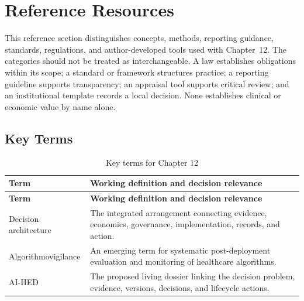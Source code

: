 \section{Reference Resources}
\label{sec:comp-ch12-reference}

This reference section distinguishes concepts, methods, reporting guidance,
standards, regulations, and author-developed tools used with Chapter~12. The
categories should not be treated as interchangeable. A law establishes obligations
within its scope; a standard or framework structures practice; a reporting guideline
supports transparency; an appraisal tool supports critical review; and an
institutional template records a local decision. None establishes clinical or
economic value by name alone. 

\subsection{Key Terms}
\begin{longtable}{@{}p{}p{}@{}}
\caption{Key terms for Chapter 12}
\label{tab:comp-ch12-key-terms}\\
\toprule
\textbf{Term} & \textbf{Working definition and decision relevance} \\
\midrule
\endfirsthead
\toprule
\textbf{Term} & \textbf{Working definition and decision relevance} \\
\midrule
\endhead
\bottomrule
\endlastfoot
Decision architecture & The integrated arrangement connecting evidence, economics, governance, implementation, records, and action. \\
Algorithmovigilance & An emerging term for systematic post-deployment evaluation and monitoring of healthcare algorithms. \\
AI-HED & The proposed living dossier linking the decision problem, evidence, versions, decisions, and lifecycle actions. \\
\end{longtable}

